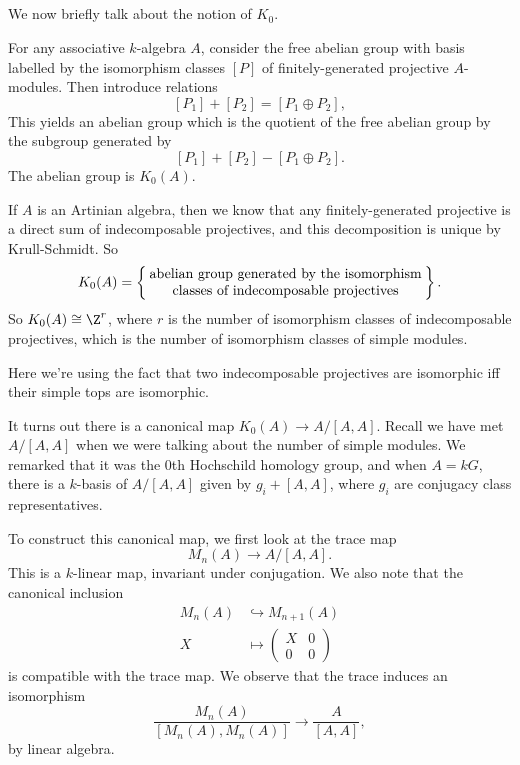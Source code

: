 \documentclass[a4paper]{article}
\begin{document}
\subsection{}
We now briefly talk about the notion of $K_0$.
\begin{defi}[$K_0$]
  For any associative $k$-algebra $A$, consider the free abelian group with basis labelled by the isomorphism classes $[P]$ of finitely-generated projective $A$-modules. Then introduce relations
  \[
    [P_1] + [P_2] = [P_1 \oplus P_2],
  \]
  This yields an abelian group which is the quotient of the free abelian group by the subgroup generated by
  \[
    [P_1] + [P_2] - [P_1 \oplus P_2].
  \]
  The abelian group is $K_0(A)$.
\end{defi}

\begin{eg}
  If $A$ is an Artinian algebra, then we know that any finitely-generated projective is a direct sum of indecomposable projectives, and this decomposition is unique by Krull-Schmidt. So
  \[
    K_0(A) = \left\{\parbox{7cm}{\centering abelian group generated by the isomorphism classes of indecomposable projectives}\right\}.
  \]
  So $K_0(A) \cong \Z^r$, where $r$ is the number of isomorphism classes of indecomposable projectives, which is the number of isomorphism classes of simple modules.

  Here we're using the fact that two indecomposable projectives are isomorphic iff their simple tops are isomorphic.
\end{eg}

It turns out there is a canonical map $K_0(A) \to A/[A, A]$. Recall we have met $A/[A, A]$ when we were talking about the number of simple modules. We remarked that it was the $0$th Hochschild homology group, and when $A = kG$, there is a $k$-basis of $A/[A, A]$ given by $g_i + [A, A]$, where $g_i$ are conjugacy class representatives.

To construct this canonical map, we first look at the trace map
\[
  M_n(A) \to A/[A, A].
\]
This is a $k$-linear map, invariant under conjugation. We also note that the canonical inclusion
\begin{align*}
  M_n(A) &\hookrightarrow M_{n + 1}(A)\\
  X & \mapsto
  \begin{pmatrix}
    X & 0\\
    0 & 0
  \end{pmatrix}
\end{align*}
is compatible with the trace map. We observe that the trace induces an isomorphism
\[
  \frac{M_n(A)}{[M_n(A), M_n(A)]} \to \frac{A}{[A, A]},
\]
by linear algebra.
\end{document}
